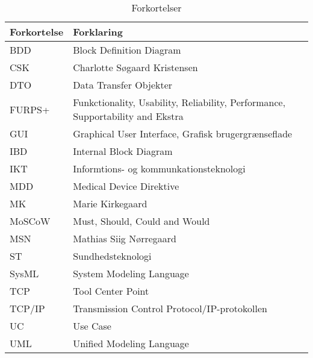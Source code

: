 \begin{table}[htb]
\begin{tabular}{ | m{6em} | m{30em} | } \hline

\textbf{Forkortelse} & \textbf{Forklaring} \\ \hline
BDD & Block Definition Diagram \\\hline
CSK & Charlotte Søgaard Kristensen \\ \hline 
DTO & Data Transfer Objekter \\\hline
FURPS+ & Funkctionality, Usability, Reliability, Performance, Supportability and Ekstra \\\hline
GUI & Graphical User Interface, Grafisk brugergrænseflade \\ \hline 
IBD & Internal Block Diagram \\\hline
IKT & Informtions- og kommunkationsteknologi\\\hline
MDD & Medical Device Direktive \\\hline
MK &  Marie Kirkegaard \\ \hline
MoSCoW & Must, Should, Could and Would \\\hline
MSN & Mathias Siig Nørregaard \\ \hline 
ST & Sundhedsteknologi \\\hline
SysML &  System Modeling Language \\\hline
TCP & Tool Center Point \\\hline
TCP/IP & Transmission Control Protocol/IP-protokollen \\\hline
UC & Use Case \\\hline
UML & Unified Modeling Language\\\hline
\end{tabular}
\caption{Forkortelser}
\end{table}
\newpage

